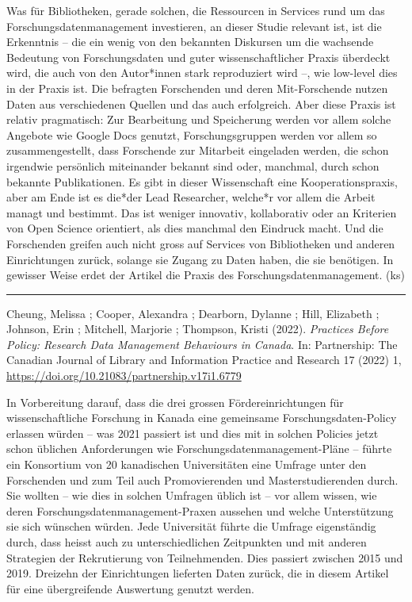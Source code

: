 \documentclass[a4paper,
fontsize=11pt,
oneside,
numbers=noperiodatend,
parskip=half-,
bibliography=totoc,
final
]{scrartcl}
\begin{document}
Was für Bibliotheken, gerade solchen, die Ressourcen in Services rund um
das Forschungsdatenmanagement investieren, an dieser Studie relevant
ist, ist die Erkenntnis -- die ein wenig von den bekannten Diskursen um
die wachsende Bedeutung von Forschungsdaten und guter wissenschaftlicher
Praxis überdeckt wird, die auch von den Autor*innen stark reproduziert
wird --, wie low-level dies in der Praxis ist. Die befragten Forschenden
und deren Mit-Forschende nutzen Daten aus verschiedenen Quellen und das
auch erfolgreich. Aber diese Praxis ist relativ pragmatisch: Zur
Bearbeitung und Speicherung werden vor allem solche Angebote wie Google
Docs genutzt, Forschungsgruppen werden vor allem so zusammengestellt,
dass Forschende zur Mitarbeit eingeladen werden, die schon irgendwie
persönlich miteinander bekannt sind oder, manchmal, durch schon bekannte
Publikationen. Es gibt in dieser Wissenschaft eine Kooperationspraxis,
aber am Ende ist es die*der Lead Researcher, welche*r vor allem die
Arbeit managt und bestimmt. Das ist weniger innovativ, kollaborativ oder
an Kriterien von Open Science orientiert, als dies manchmal den Eindruck
macht. Und die Forschenden greifen auch nicht gross auf Services von
Bibliotheken und anderen Einrichtungen zurück, solange sie Zugang zu
Daten haben, die sie benötigen. In gewisser Weise erdet der Artikel die
Praxis des Forschungsdatenmanagement. (ks)

\begin{center}\rule{0.5\linewidth}{0.5pt}\end{center}

Cheung, Melissa ; Cooper, Alexandra ; Dearborn, Dylanne ; Hill,
Elizabeth ; Johnson, Erin ; Mitchell, Marjorie ; Thompson, Kristi
(2022). \emph{Practices Before Policy: Research Data Management
Behaviours in Canada}. In: Partnership: The Canadian Journal of Library
and Information Practice and Research 17 (2022) 1,
\url{https://doi.org/10.21083/partnership.v17i1.6779}

In Vorbereitung darauf, dass die drei grossen Fördereinrichtungen für
wissenschaftliche Forschung in Kanada eine gemeinsame
Forschungsdaten-Policy erlassen würden -- was 2021 passiert ist und dies
mit in solchen Policies jetzt schon üblichen Anforderungen wie
Forschungsdaten\-management-Pläne -- führte ein Konsortium von 20
kanadischen Universitäten eine Umfrage unter den Forschenden und zum
Teil auch Promovierenden und Masterstudierenden durch. Sie wollten --
wie dies in solchen Umfragen üblich ist -- vor allem wissen, wie deren
Forschungsdaten\-management-Praxen aussehen und welche Unterstützung sie
sich wünschen würden. Jede Universität führte die Umfrage eigenständig
durch, dass heisst auch zu unterschiedlichen Zeitpunkten und mit anderen
Strategien der Rekrutierung von Teilnehmenden. Dies passiert zwischen
2015 und 2019. Dreizehn der Einrichtungen lieferten Daten zurück, die in
diesem Artikel für eine übergreifende Auswertung genutzt werden.
\end{document}
